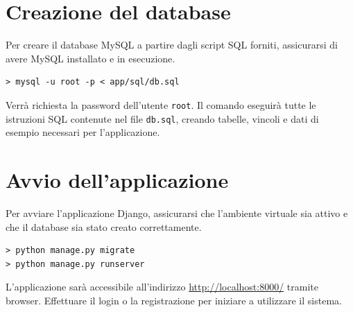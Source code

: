 \documentclass[a4paper,12pt]{report}
\begin{document}
\section{Creazione del database}

Per creare il database MySQL a partire dagli script SQL forniti, assicurarsi di avere MySQL
installato e in esecuzione.

\begin{verbatim}
> mysql -u root -p < app/sql/db.sql
\end{verbatim}

Verrà richiesta la password dell'utente \texttt{root}. Il comando eseguirà tutte le
istruzioni SQL contenute nel file \texttt{db.sql}, creando tabelle, vincoli e dati di
esempio necessari per l'applicazione.

\section{Avvio dell'applicazione}

Per avviare l'applicazione Django, assicurarsi che l'ambiente virtuale sia attivo e che il database
sia stato creato correttamente.

\begin{verbatim}
> python manage.py migrate
> python manage.py runserver
\end{verbatim}

L'applicazione sarà accessibile all'indirizzo \url{http://localhost:8000/} tramite browser. Effettuare
il login o la registrazione per iniziare a utilizzare il sistema.
\end{document}
